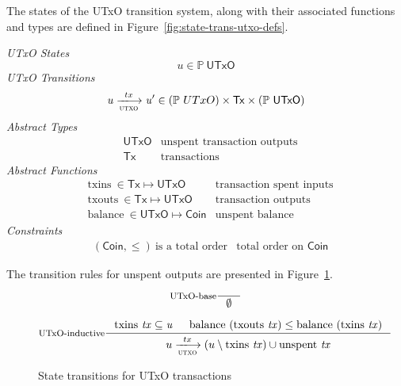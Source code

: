 \documentclass[11pt,a4paper]{article}
\newcommand{\powerset}[1]{\mathbb{P}~#1}
\newcommand{\var}[1]{\mathit{#1}}
\newcommand{\type}[1]{\mathsf{#1}}
\newcommand{\transitionarrow}[2]{\xlongrightarrow[\textsc{#1}]{#2}}
\newcommand{\nextdef}{\\[1em]}
\newcommand{\Tx}{\type{Tx}}
\newcommand{\UTxO}{\type{UTxO}}
\newcommand{\Coin}{\type{Coin}}
\newcommand{\txins}[1]{\text{txins}\ \var{#1}}
\newcommand{\txouts}[1]{\text{txouts}\ \var{#1}}
\newcommand{\balance}[1]{\text{balance}\ \var{#1}}
\newcommand{\unspent}[1]{\text{unspent}\ \var{#1}}
\begin{document}
The states of the UTxO transition system, along with their associated functions
and types are defined in Figure~\ref{fig:state-trans-utxo-defs}.
\begin{figure*}[h]
  \emph{UTxO States}
  \begin{equation*}
    \var{u} \in \powerset{\UTxO}
  \end{equation*}
  \emph{UTxO Transitions}
  \begin{equation*}
    \var{u} \transitionarrow{utxo}{tx} \var{u'}
    \in (\powerset{UTxO}) \times \Tx \times (\powerset{\UTxO})
  \end{equation*}  
  \emph{Abstract Types}
  \begin{align*}
    & \type{UTxO} & \text{unspent transaction outputs}
    \nextdef
    & \type{Tx} & \text{transactions}
  \end{align*}
  \emph{Abstract Functions}
  \begin{align*}
    & \txins{} \in \Tx \mapsto \UTxO & \text{transaction spent inputs}
    \nextdef
    & \txouts{} \in \Tx \mapsto \UTxO & \text{transaction outputs}
    \nextdef
    & \balance{} \in \UTxO \mapsto \Coin & \text{unspent balance}
  \end{align*}
  \emph{Constraints}
  \begin{align*}
    & (\Coin, \leq)~\text{is a total order} & \text{total order on }\Coin
  \end{align*}
  \caption{Definitions associated to the UTxO transition system}
  \label{fig:state-trans-utxo-defs}
\end{figure*}

The transition rules for unspent outputs are presented in Figure~\ref{fig:state-trans-utxo}.

\begin{figure}[h]

  \centering
  \begin{equation}\label{eq:utxo-base}
    \inference[UTxO-base]
    {}
    {\emptyset}
  \end{equation}
  
  \begin{equation}\label{eq:utxo-inductive}
    \inference[UTxO-inductive]
    { \txins{tx} \subseteq \mathit{u}
      & \balance{(\txouts{tx})} \leq \balance{(\txins{tx})}
    }
    {u \transitionarrow{utxo}{tx} (u \setminus \txins{tx}) \cup \unspent{tx}}
  \end{equation}
  \caption{State transitions for UTxO transactions}
  \label{fig:state-trans-utxo}
\end{figure}
\end{document}
